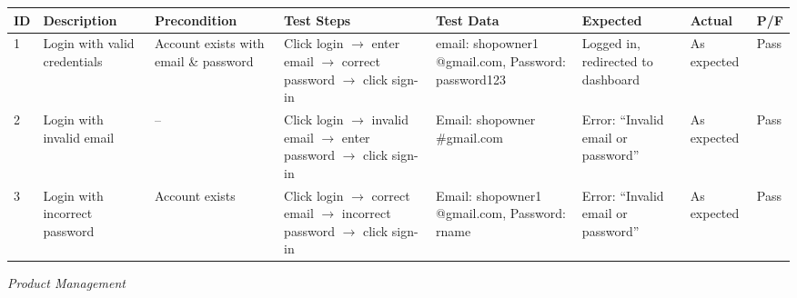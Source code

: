\documentclass[12pt,a4paper]{report}
\begin{document}
\begin{center}
\footnotesize
\begin{longtable}{p{0.4cm} p{2.2cm} p{1.8cm} p{3.2cm} p{2.2cm} p{2.2cm} p{1.4cm} p{0.8cm}}
\toprule
\textbf{ID} & \textbf{Description} & \textbf{Precondition} & \textbf{Test Steps} & \textbf{Test Data} & \textbf{Expected} & \textbf{Actual} & \textbf{P/F}\\
\midrule
\endhead
1 & Login with valid credentials & Account exists with email \& password & Click login $\to$ enter email $\to$ correct password $\to$ click sign-in & email: shopowner1 @gmail.com, Password: password123 & Logged in, redirected to dashboard & As expected & Pass\\[4pt]
2 & Login with invalid email & -- & Click login $\to$ invalid email $\to$ enter password $\to$ click sign-in & Email: shopowner \#gmail.com & Error: ``Invalid email or password'' & As expected & Pass\\[4pt]
3 & Login with incorrect password & Account exists & Click login $\to$ correct email $\to$ incorrect password $\to$ click sign-in & Email: shopowner1 @gmail.com, Password: rname & Error: ``Invalid email or password'' & As expected & Pass\\
\bottomrule
\end{longtable}
\end{center}

\textit{Product Management}
\end{document}
